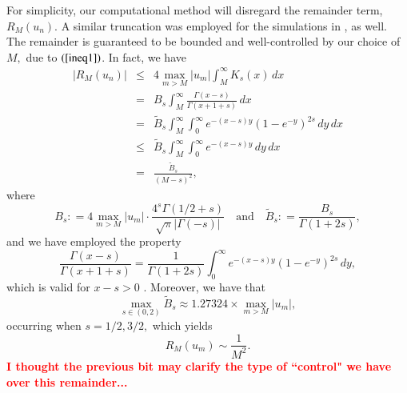 \documentclass[final,1p,times]{elsarticle}
\def\ZZ{\mathbb Z} %
\newcommand{\bb}[1]{\begin{equation}\label{#1}}
\newcommand{\ee}{\end{equation}}
\newcommand{\bbbb}{\begin{eqnarray*}}
\newcommand{\eeee}{\end{eqnarray*}}
\def\R#1{$(\ref{#1})$}
\theoremstyle{remark}
\theoremstyle{definition}
\newcommand{\josh}[1]{\textcolor{red}{\textbf{#1}}}
\begin{document}


For simplicity, our computational method will disregard the remainder term, $R_M(u_n).$ A similar truncation was employed for the simulations in \cite{ciaurri2015fractional,ciaurri2016nonlocal}, as well. 
The remainder is guaranteed to be bounded and well-controlled by our choice of $M,$ due to \R{ineq1}.
In fact, we have
\bbbb
|R_M(u_n)| & \le & 4\max_{m>M}|u_m|\int_M^\infty K_s(x)\,dx\\
& = & B_s \int_M^\infty \frac{\Gamma(x-s)}{\Gamma(x+1+s)}\,dx\\
& = & \tilde{B}_s \int_M^\infty \int_0^\infty e^{-(x-s)y}(1-e^{-y})^{2s}\,dy\,dx\\
& \le & \tilde{B}_s\int_M^\infty\int_0^\infty e^{-(x-s)y}\,dy\,dx\\
& = & \frac{\tilde{B}_s}{(M-s)^2},
\eeee
where 
$$B_s \mathrel{\mathop:}= 4\max_{m>M}|u_m|\cdot\frac{4^s\Gamma(1/2+s)}{\sqrt{\pi}|\Gamma(-s)|} \quad \mbox{and}\quad \tilde{B}_s\mathrel{\mathop:}= \frac{B_s}{\Gamma(1+2s)},$$ 
and we have employed the property
\bb{gammaprop}
\frac{\Gamma(x-s)}{\Gamma(x+1+s)} = \frac{1}{\Gamma(1+2s)}\int_0^\infty e^{-(x-s)y}(1-e^{-y})^{2s}\,dy,
\ee
which is valid for $x-s>0$ \cite{LAFORGIA2012833}. Moreover, we have that
$$\max_{s\in(0,2)} \tilde{B}_s \approx 1.27324\times\max_{m>M}|u_m|,$$
occurring when $s = 1/2,3/2,$ which yields
\bb{r_m}
R_M(u_m) \sim \frac{1}{M^2}.
\ee
\josh{I thought the previous bit may clarify the type of ``control" we have over this remainder...}

\end{document}
